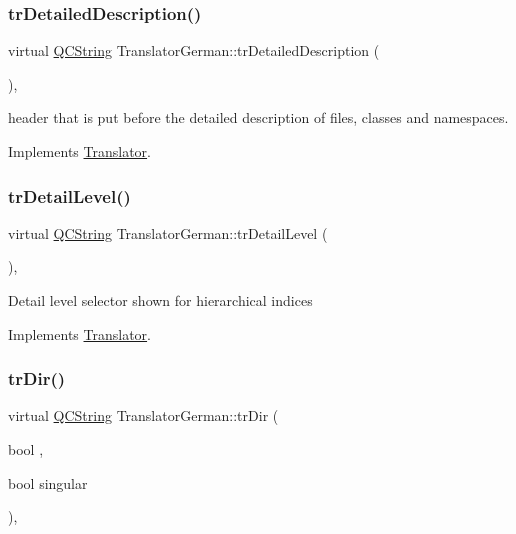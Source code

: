 \subsubsection{\texorpdfstring{trDetailedDescription()}{trDetailedDescription()}}
{\footnotesize\ttfamily virtual \mbox{\hyperlink{class_q_c_string}{Q\+C\+String}} Translator\+German\+::tr\+Detailed\+Description (\begin{DoxyParamCaption}{ }\end{DoxyParamCaption})\hspace{0.3cm}{\ttfamily [inline]}, {\ttfamily [virtual]}}

header that is put before the detailed description of files, classes and namespaces. 

Implements \mbox{\hyperlink{class_translator}{Translator}}.

\mbox{\label{class_translator_german_af424459fd7a15e7a67a74ea2db13d682}} 
\subsubsection{\texorpdfstring{trDetailLevel()}{trDetailLevel()}}
{\footnotesize\ttfamily virtual \mbox{\hyperlink{class_q_c_string}{Q\+C\+String}} Translator\+German\+::tr\+Detail\+Level (\begin{DoxyParamCaption}{ }\end{DoxyParamCaption})\hspace{0.3cm}{\ttfamily [inline]}, {\ttfamily [virtual]}}

Detail level selector shown for hierarchical indices 

Implements \mbox{\hyperlink{class_translator}{Translator}}.

\mbox{\label{class_translator_german_ab6d10fdf35b3ba3de9aeefa8544f00a8}} 
\subsubsection{\texorpdfstring{trDir()}{trDir()}}
{\footnotesize\ttfamily virtual \mbox{\hyperlink{class_q_c_string}{Q\+C\+String}} Translator\+German\+::tr\+Dir (\begin{DoxyParamCaption}\item[{bool}]{,  }\item[{bool}]{singular }\end{DoxyParamCaption})\hspace{0.3cm}{\ttfamily [inline]}, {\ttfamily [virtual]}}

